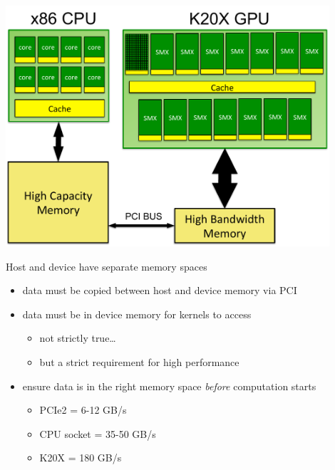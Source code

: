 
\begin{frame}[fragile]{}
    \begin{center}
        \includegraphics[width=0.9\textwidth]{./images/node.pdf}
    \end{center}
\end{frame}

\begin{frame}[fragile]{}
    \begin{info}{Host and device have separate memory spaces}
        \begin{itemize}
            \item data must be copied between host and device memory via PCI
            \item data must be in device memory for kernels to access
                \begin{itemize}
                    \item not strictly true\ldots
                    \item but a strict requirement for high performance
                \end{itemize}
            \item ensure data is in the right memory space \emph{before} computation starts
            \begin{itemize}
                \item PCIe2 = 6-12 GB/s
                \item CPU socket = 35-50 GB/s
                \item K20X  = 180 GB/s
            \end{itemize}
        \end{itemize}
    \end{info}

\end{frame}

